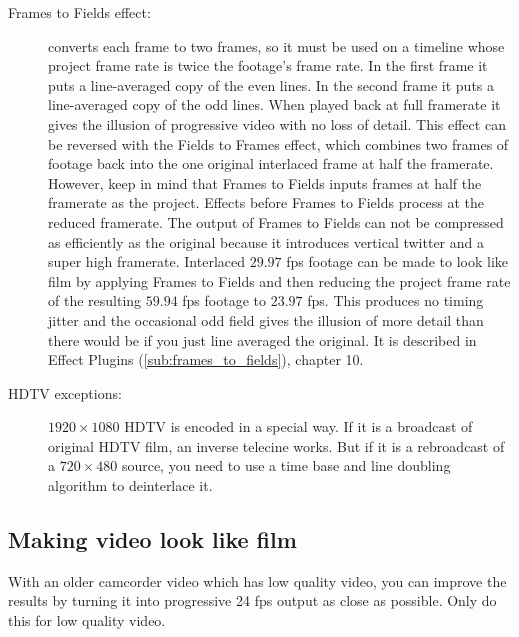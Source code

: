 \begin{description}
	\item[Frames to Fields effect:] converts each frame to two frames, so it must be used on a timeline whose project frame rate is twice the footage's frame rate. In the first frame it puts a line-averaged copy of the even lines. In the second frame it puts a line-averaged copy of the odd lines. When played back at full framerate it gives the illusion of progressive video with no loss of detail. This effect can be reversed with the Fields to Frames effect, which combines two frames of footage back into the one original interlaced frame at half the framerate. However, keep in mind that Frames to Fields inputs frames at half the framerate as the project. Effects before Frames to Fields process at the reduced framerate.  The output of Frames to Fields can not be compressed as efficiently as the original because it introduces vertical twitter and a super high framerate. Interlaced $29.97$ fps footage can be made to look like film by applying Frames to Fields and then reducing the project frame rate of the resulting $59.94$ fps footage to $23.97$ fps. This produces no timing jitter and the occasional odd field gives the illusion of more detail than there would be if you just line averaged the original. It is described in Effect Plugins (\ref{sub:frames_to_fields}), chapter 10.
	\item[HDTV exceptions:] $1920\times1080$ HDTV is encoded in a special way. If it is a broadcast of original HDTV film, an inverse telecine works.  But if it is a rebroadcast of a $720\times480$ source, you need to use a time base and line doubling algorithm to deinterlace it.
\end{description}

\subsection{Making video look like film}%
\label{sub:making_video_look_film}

With an older camcorder video which has low quality video, you can improve the results by turning it into progressive 24 fps output as close as possible.  Only do this for low quality video.

